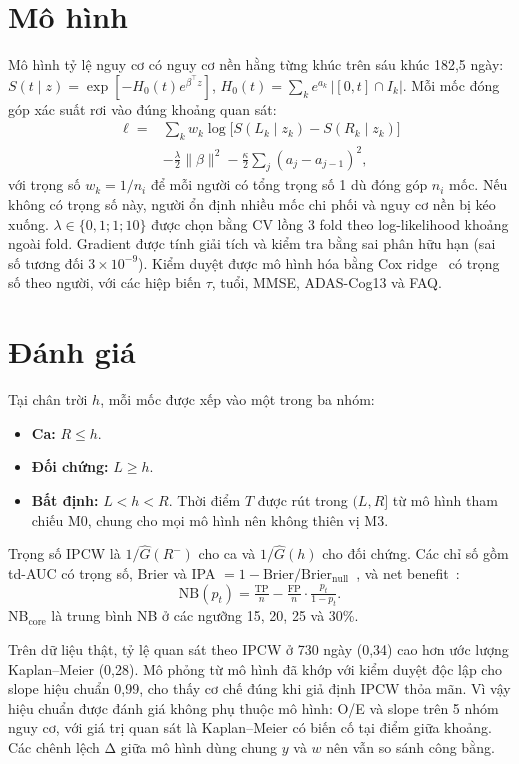 \documentclass[conference]{IEEEtran}
\begin{document}
\section{Mô hình}
Mô hình tỷ lệ nguy cơ có nguy cơ nền hằng từng khúc trên sáu khúc 182,5 ngày:
$S(t\mid z)=\exp[-H_0(t)e^{\beta^\top z}]$, $H_0(t)=\sum_k e^{a_k}\,|[0,t]\cap I_k|$.
Mỗi mốc đóng góp xác suất rơi vào đúng khoảng quan sát:
\begin{equation}
\begin{aligned}
\ell={}&\textstyle\sum_k w_k\log\big[S(L_k\mid z_k)-S(R_k\mid z_k)\big]\\
&-\tfrac{\lambda}{2}\lVert\beta\rVert^2-\tfrac{\kappa}{2}\textstyle\sum_j(a_j-a_{j-1})^2 ,
\end{aligned}
\end{equation}
với trọng số $w_k=1/n_i$ để mỗi người có tổng trọng số 1 dù đóng góp $n_i$ mốc. Nếu không có trọng số này, người ổn định nhiều mốc chi phối và nguy cơ nền bị kéo xuống. $\lambda\in\{0{,}1;1;10\}$ được chọn bằng CV lồng 3 fold theo log-likelihood khoảng ngoài fold. Gradient được tính giải tích và kiểm tra bằng sai phân hữu hạn (sai số tương đối $3\times10^{-9}$). Kiểm duyệt được mô hình hóa bằng Cox ridge~\cite{cox} có trọng số theo người, với các hiệp biến $\tau$, tuổi, MMSE, ADAS-Cog13 và FAQ.

\section{Đánh giá}
Tại chân trời $h$, mỗi mốc được xếp vào một trong ba nhóm:
\begin{itemize}
\item \textbf{Ca:} $R\le h$.
\item \textbf{Đối chứng:} $L\ge h$.
\item \textbf{Bất định:} $L<h<R$. Thời điểm $T$ được rút trong $(L,R]$ từ mô hình tham chiếu M0, chung cho mọi mô hình nên không thiên vị M3.
\end{itemize}
Trọng số IPCW là $1/\hat G(R^-)$ cho ca và $1/\hat G(h)$ cho đối chứng. Các chỉ số gồm td-AUC có trọng số, Brier và IPA $=1-\mathrm{Brier}/\mathrm{Brier}_{\text{null}}$~\cite{ipa}, và net benefit~\cite{dca}:
\begin{equation}
\mathrm{NB}(p_t)=\tfrac{\mathrm{TP}}{n}-\tfrac{\mathrm{FP}}{n}\cdot\tfrac{p_t}{1-p_t}.
\end{equation}
NB$_{\text{core}}$ là trung bình NB ở các ngưỡng 15, 20, 25 và 30\%.

Trên dữ liệu thật, tỷ lệ quan sát theo IPCW ở 730 ngày (0,34) cao hơn ước lượng Kaplan–Meier (0,28). Mô phỏng từ mô hình đã khớp với kiểm duyệt độc lập cho slope hiệu chuẩn 0,99, cho thấy cơ chế đúng khi giả định IPCW thỏa mãn. Vì vậy hiệu chuẩn được đánh giá không phụ thuộc mô hình: O/E và slope trên 5 nhóm nguy cơ, với giá trị quan sát là Kaplan–Meier có biến cố tại điểm giữa khoảng. Các chênh lệch Δ giữa mô hình dùng chung $y$ và $w$ nên vẫn so sánh công bằng.
\end{document}
